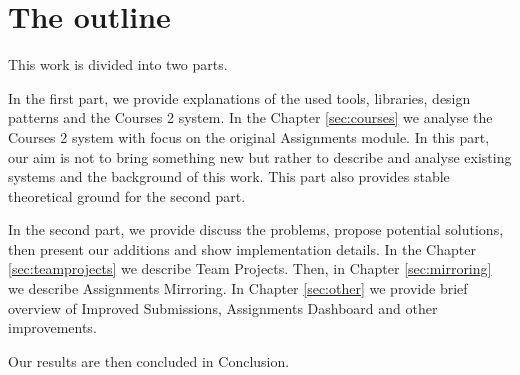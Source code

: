 \section*{The outline}
This work is divided into two parts.

In the first part, we provide explanations of the used tools, libraries, design patterns and the Courses 2 system. In the Chapter \ref{sec:courses} we analyse the Courses 2 system with focus on the original Assignments module. In this part, our aim is not to bring something new but rather to describe and analyse existing systems and the background of this work. This part also provides stable theoretical ground for the second part.

In the second part, we provide discuss the problems, propose potential solutions, then present our additions and show implementation details. In the Chapter \ref{sec:teamprojects} we describe Team Projects. Then, in Chapter \ref{sec:mirroring} we describe Assignments Mirroring. In Chapter \ref{sec:other} we provide brief overview of Improved Submissions, Assignments Dashboard and other improvements.

Our results are then concluded in Conclusion.
